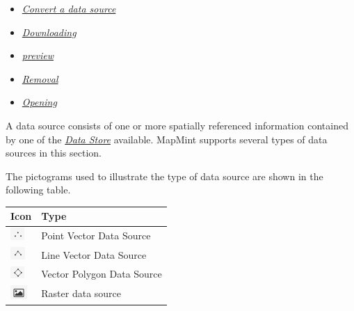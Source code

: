 \documentclass[letterpaper,10pt,english]{sphinxmanual}
\begin{document}
{\begin{minipage}{0.95\linewidth}
\begin{itemize}
\begin{itemize}
\begin{itemize}
\item {} 
\label{data/datasources:id16}{\hyperref[data/datasources:convertir-une-source-de-donnees]{\emph{Convert a data source}}}

\item {} 
\label{data/datasources:id17}{\hyperref[data/datasources:telechargement]{\emph{Downloading}}}

\item {} 
\label{data/datasources:id18}{\hyperref[data/datasources:previsualisation]{\emph{preview}}}

\item {} 
\label{data/datasources:id19}{\hyperref[data/datasources:suppression]{\emph{Removal}}}

\item {} 
\label{data/datasources:id20}{\hyperref[data/datasources:ouverture]{\emph{Opening}}}

\end{itemize}

\end{itemize}

\end{itemize}
\end{minipage}}
\begin{center}\setlength{\fboxsep}{5pt}\end{center}

A data source consists of one or more spatially referenced information contained by one of the {\hyperref[data/datastores::doc]{\emph{\emph{Data Store}}}} available. MapMint supports several types of data sources in this section.

The pictograms used to illustrate the type of data source are shown in the following table.

\begin{tabulary}{\linewidth}{|L|L|}
\hline

\textbf{Icon}
 & 
\textbf{Type}
\\
\hline
\includegraphics{data-vector-point-icon.png}
 & 
Point Vector Data Source
\\
\hline
\includegraphics{data-vector-line-icon.png}
 & 
Line Vector Data Source
\\
\hline
\includegraphics{data-vector-polygon-icon.png}
 & 
Vector Polygon Data Source
\\
\hline
\includegraphics{data-raster-icon.png}
 & 
Raster data source
\\
\hline\end{tabulary}
\end{document}
